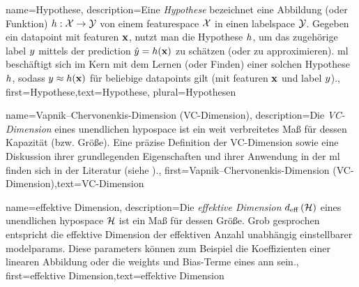 {{{{{
{name={Hypothese},
	description={Eine \emph{Hypothese} bezeichnet eine Abbildung (oder Funktion) 
		$h: \mathcal{X} \rightarrow \mathcal{Y}$ von einem \gls{featurespace} $\mathcal{X}$ 
		in einen \gls{labelspace} $\mathcal{Y}$. 
		Gegeben ein \gls{datapoint} mit \gls{feature}n ${\bf x}$, 
		nutzt man die Hypothese $h$, um das zugehörige \gls{label} $y$ 
		mittels der \gls{prediction} $\hat{y} = h({\bf x})$ zu schätzen (oder zu approximieren). 
		\gls{ml} beschäftigt sich im Kern mit dem Lernen (oder Finden) einer solchen Hypothese $h$, 
		sodass $y \approx h({\bf x})$ für beliebige \glspl{datapoint} gilt 
		(mit \gls{feature}n ${\bf x}$ und \gls{label} $y$).},
	first={Hypothese},text={Hypothese}, plural={Hypothesen}  
}


{name={Vapnik–Chervonenkis-Dimension (VC-Dimension)},
	description={Die \emph{VC-Dimension} eines unendlichen \gls{hypospace} ist ein weit verbreitetes Maß für dessen Kapazität (bzw. Größe). 
		Eine präzise Definition der VC-Dimension sowie eine Diskussion ihrer grundlegenden Eigenschaften und ihrer Anwendung in der \gls{ml} finden sich in der Literatur 
		(siehe \cite{ShalevMLBook}).},
	first={Vapnik–Chervonenkis-Dimension (VC-Dimension)},text={VC-Dimension}  
}

{name={effektive Dimension},
	description={Die \emph{effektive Dimension} $d_{\rm eff} \left( \mathcal{H} \right)$ eines unendlichen \gls{hypospace} $\mathcal{H}$ 
		ist ein Maß für dessen Größe. Grob gesprochen entspricht die effektive Dimension 
		der effektiven Anzahl unabhängig einstellbarer \gls{modelparams}. 
		Diese \gls{parameters} können zum Beispiel die Koeffizienten einer linearen Abbildung 
		oder die \gls{weights} und Bias-Terme eines \gls{ann} sein.},
	first={effektive Dimension},text={effektive Dimension}  
}



}}}}}
